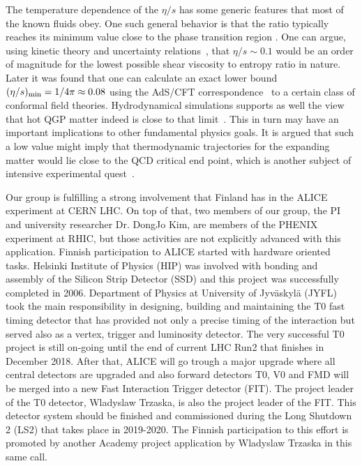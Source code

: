 The temperature dependence of the $\eta/s$ has some generic features that most of the known fluids obey. One such general behavior is that the ratio typically reaches its minimum value close to the phase transition region \cite{PhysRevLett.98.092301}. One can argue, using kinetic theory and uncertainty relations~\cite{PhysRevD.31.53}, that $\eta/s\sim0.1$ would be an order of magnitude for the lowest possible shear viscosity to entropy ratio in nature. Later it was found that one can calculate an exact lower bound $(\eta/s)_{\rm min}=1/4\pi\approx0.08$ using the AdS/CFT correspondence~\cite{PhysRevLett.94.111601} to a certain class of conformal field theories. Hydrodynamical simulations supports as well the view that hot QGP matter indeed is close to that limit~\cite{Gale:2012rq}. This in turn may have an important implications to other fundamental physics goals. It is argued that such a low value might imply that thermodynamic trajectories for the expanding matter would lie close to the QCD critical end point, which is another subject of intensive experimental quest~\cite{PhysRevLett.98.092301}.

Our group is fulfilling a strong involvement that Finland has in the ALICE experiment at CERN LHC. On top of that, two members of our group, the PI and university researcher Dr. DongJo Kim, are members of the PHENIX experiment at RHIC, but those activities are not explicitly advanced with this application. Finnish participation to ALICE started with hardware oriented tasks. Helsinki Institute of Physics (HIP) was involved with bonding and assembly of the Silicon Strip Detector (SSD) and this project was successfully completed in 2006. Department of Physics at University of Jyv\"askyl\"a (JYFL) took the main responsibility in designing, building and maintaining the T0 fast timing detector that has provided not only a precise timing of the interaction but served also as a vertex, trigger and luminosity detector. The very successful T0 project is still on-going until the end of current LHC Run2 that finishes in December 2018. After that, ALICE will go trough a major upgrade where all central detectors are upgraded and also forward detectors T0, V0 and FMD will be merged into a new Fast Interaction Trigger detector  (FIT). The project leader of the T0 detector, Wladyslaw Trzaska, is also the project leader of the FIT. 
This detector system should be finished and commissioned during the Long Shutdown 2 (LS2) that takes place in 2019-2020. The Finnish participation to this effort is promoted by another Academy project application by Wladyslaw Trzaska in this same call.

